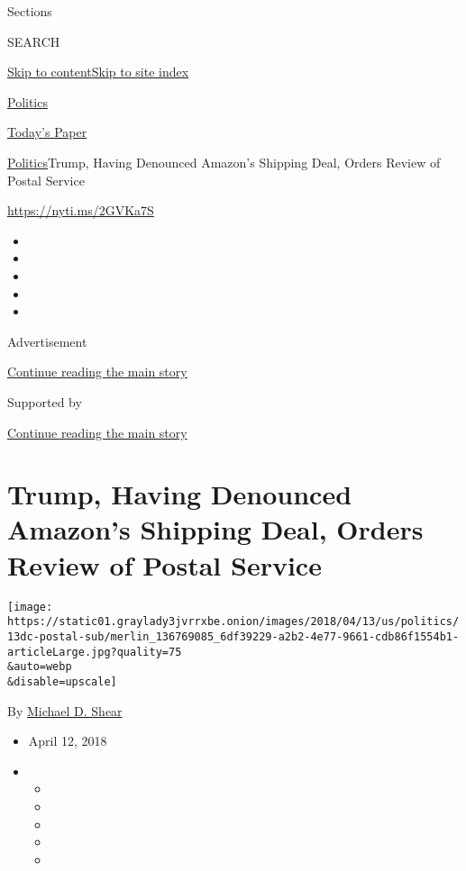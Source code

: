 Sections

SEARCH

\protect\hyperlink{site-content}{Skip to
content}\protect\hyperlink{site-index}{Skip to site index}

\href{https://www.nytimes3xbfgragh.onion/section/politics}{Politics}

\href{https://myaccount.nytimes3xbfgragh.onion/auth/login?response_type=cookie\&client_id=vi}{}

\href{https://www.nytimes3xbfgragh.onion/section/todayspaper}{Today's
Paper}

\href{/section/politics}{Politics}\textbar{}Trump, Having Denounced
Amazon's Shipping Deal, Orders Review of Postal Service

\url{https://nyti.ms/2GVKa7S}

\begin{itemize}
\item
\item
\item
\item
\item
\end{itemize}

Advertisement

\protect\hyperlink{after-top}{Continue reading the main story}

Supported by

\protect\hyperlink{after-sponsor}{Continue reading the main story}

\hypertarget{trump-having-denounced-amazons-shipping-deal-orders-review-of-postal-service}{%
\section{Trump, Having Denounced Amazon's Shipping Deal, Orders Review
of Postal
Service}\label{trump-having-denounced-amazons-shipping-deal-orders-review-of-postal-service}}

\texttt{[image: https://static01.graylady3jvrrxbe.onion/images/2018/04/13/us/politics/13dc-postal-sub/merlin\_136769085\_6df39229-a2b2-4e77-9661-cdb86f1554b1-articleLarge.jpg?quality=75\\\&auto=webp\\\&disable=upscale]}

By \href{http://www.nytimes3xbfgragh.onion/by/michael-d-shear}{Michael
D. Shear}

\begin{itemize}
\item
  April 12, 2018
\item
  \begin{itemize}
  \item
  \item
  \item
  \item
  \item
  \end{itemize}
\end{itemize}

